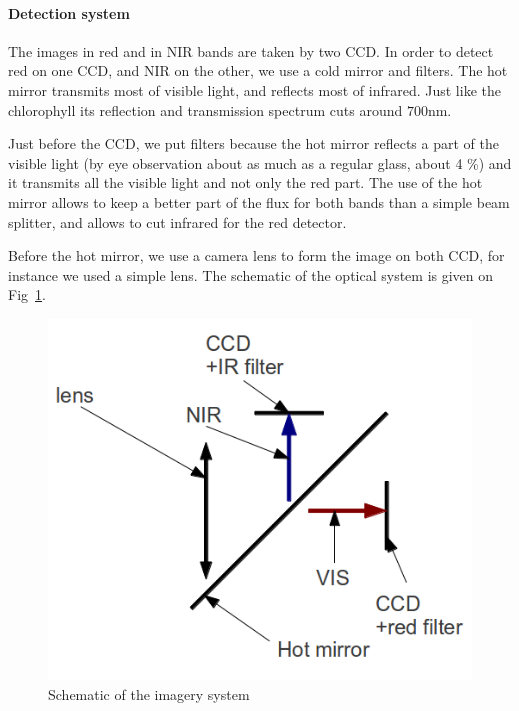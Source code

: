 \documentclass[twocolumn,10pt]{article}
\begin{document}
        \paragraph*{Detection system} The images in red and in NIR bands are taken by two CCD. In order to detect red on one CCD, and NIR on the other, we use a cold mirror and filters. The hot mirror transmits most of visible light, and reflects most of infrared. Just like the chlorophyll its reflection and transmission spectrum cuts around $700\textrm{nm}$.
        \par  Just before the CCD, we put filters because the hot mirror reflects a part of the visible light (by eye observation about as much as a regular glass, about 4 \%) and it transmits all the visible light and not only the red part. The use of the hot mirror allows to keep a better part of the flux for both bands than a simple beam splitter, and allows to cut infrared for the red detector. 
        \par Before the hot mirror, we use a camera lens to form the image on both CCD, for instance we used a simple lens. The schematic of the optical system is given on Fig~\ref{sch_opt}.
        \begin{figure}[!h]
        \includegraphics[scale=.5]{sch_opt.png}
        \caption{Schematic of the imagery system}
        \label{sch_opt}
        \end{figure}
\end{document}
